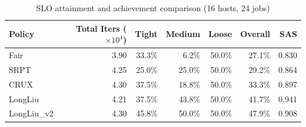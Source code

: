 \begin{table}[t]
\centering
\caption{SLO attainment and achievement comparison (16 hosts, 24 jobs)}
\label{tab:slo_16host}
\begin{tabular}{l|r|r|r|r|r|r}
\hline
Policy & Total Iters ($\times 10^4$) & Tight & Medium & Loose & Overall & SAS \\
\hline
Fair & 3.90 & 33.3\% & 6.2\% & 50.0\% & 27.1\% & 0.830 \\
SRPT & 4.25 & 25.0\% & 25.0\% & 50.0\% & 29.2\% & 0.864 \\
CRUX & 4.30 & 37.5\% & 18.8\% & 50.0\% & 33.3\% & 0.897 \\
LongLiu & 4.21 & 37.5\% & 43.8\% & 50.0\% & 41.7\% & 0.941 \\
LongLiu_v2 & 4.30 & 45.8\% & 50.0\% & 50.0\% & 47.9\% & 0.908 \\
\hline
\end{tabular}
\end{table}
